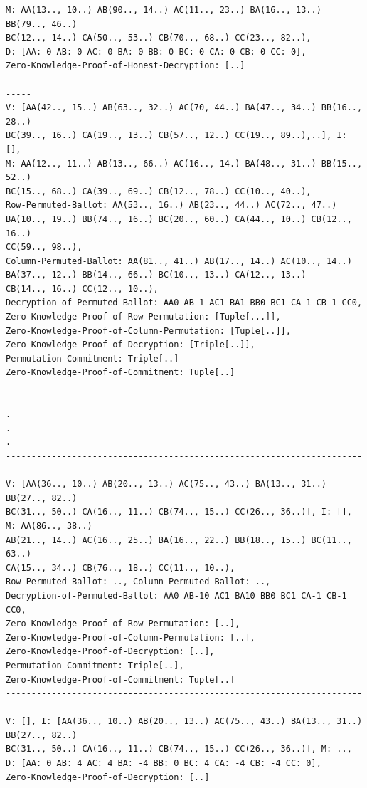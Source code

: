 \documentclass{llncs}
\begin{document}
\begin{lstlisting}[frame=single,basicstyle=\ttfamily\footnotesize]
M: AA(13.., 10..) AB(90.., 14..) AC(11.., 23..) BA(16.., 13..) BB(79.., 46..)
BC(12.., 14..) CA(50.., 53..) CB(70.., 68..) CC(23.., 82..), 
D: [AA: 0 AB: 0 AC: 0 BA: 0 BB: 0 BC: 0 CA: 0 CB: 0 CC: 0], 
Zero-Knowledge-Proof-of-Honest-Decryption: [..]
---------------------------------------------------------------------------
V: [AA(42.., 15..) AB(63.., 32..) AC(70, 44..) BA(47.., 34..) BB(16.., 28..)
BC(39.., 16..) CA(19.., 13..) CB(57.., 12..) CC(19.., 89..),..], I:  [], 
M: AA(12.., 11..) AB(13.., 66..) AC(16.., 14.) BA(48.., 31..) BB(15.., 52..)
BC(15.., 68..) CA(39.., 69..) CB(12.., 78..) CC(10.., 40..),
Row-Permuted-Ballot: AA(53.., 16..) AB(23.., 44..) AC(72.., 47..)
BA(10.., 19..) BB(74.., 16..) BC(20.., 60..) CA(44.., 10..) CB(12.., 16..)
CC(59.., 98..),
Column-Permuted-Ballot: AA(81.., 41..) AB(17.., 14..) AC(10.., 14..) 
BA(37.., 12..) BB(14.., 66..) BC(10.., 13..) CA(12.., 13..) 
CB(14.., 16..) CC(12.., 10..),
Decryption-of-Permuted Ballot: AA0 AB-1 AC1 BA1 BB0 BC1 CA-1 CB-1 CC0,
Zero-Knowledge-Proof-of-Row-Permutation: [Tuple[...]], 
Zero-Knowledge-Proof-of-Column-Permutation: [Tuple[..]], 
Zero-Knowledge-Proof-of-Decryption: [Triple[..]], 
Permutation-Commitment: Triple[..]
Zero-Knowledge-Proof-of-Commitment: Tuple[..]
------------------------------------------------------------------------------------------
.
.
.
------------------------------------------------------------------------------------------
V: [AA(36.., 10..) AB(20.., 13..) AC(75.., 43..) BA(13.., 31..) BB(27.., 82..)
BC(31.., 50..) CA(16.., 11..) CB(74.., 15..) CC(26.., 36..)], I: [], M: AA(86.., 38..)
AB(21.., 14..) AC(16.., 25..) BA(16.., 22..) BB(18.., 15..) BC(11.., 63..)
CA(15.., 34..) CB(76.., 18..) CC(11.., 10..), 
Row-Permuted-Ballot: .., Column-Permuted-Ballot: .., 
Decryption-of-Permuted-Ballot: AA0 AB-10 AC1 BA10 BB0 BC1 CA-1 CB-1 CC0,
Zero-Knowledge-Proof-of-Row-Permutation: [..],
Zero-Knowledge-Proof-of-Column-Permutation: [..], 
Zero-Knowledge-Proof-of-Decryption: [..], 
Permutation-Commitment: Triple[..], 
Zero-Knowledge-Proof-of-Commitment: Tuple[..]
------------------------------------------------------------------------------------
V: [], I: [AA(36.., 10..) AB(20.., 13..) AC(75.., 43..) BA(13.., 31..) BB(27.., 82..)
BC(31.., 50..) CA(16.., 11..) CB(74.., 15..) CC(26.., 36..)], M: .., 
D: [AA: 0 AB: 4 AC: 4 BA: -4 BB: 0 BC: 4 CA: -4 CB: -4 CC: 0],
Zero-Knowledge-Proof-of-Decryption: [..]

\end{lstlisting}
\end{document}
